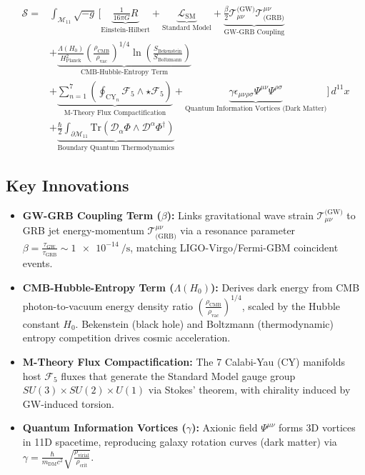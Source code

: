 \documentclass[12pt, a4paper]{article}
\begin{document}
\[
\boxed{
\begin{aligned}
\mathcal{S} = & \int_{\mathcal{M}_{11}} \sqrt{-g} \, \Bigg[ \underbrace{\frac{1}{16\pi G} R}_{\text{Einstein-Hilbert}} + \underbrace{\mathcal{L}_{\text{SM}}}_{\text{Standard Model}} + \underbrace{\frac{\beta}{2} \mathcal{T}_{\mu\nu}^{\text{(GW)}} \mathcal{T}^{\mu\nu}_{\text{(GRB)}}}_{\text{GW-GRB Coupling}} \\
& + \underbrace{\frac{\Lambda(H_0)}{H_{\text{Planck}}^2} \left( \frac{\rho_{\text{CMB}}}{\rho_{\text{vac}}} \right)^{1/4} \ln\left(\frac{S_{\text{Bekenstein}}}{S_{\text{Boltzmann}}}\right)}_{\text{CMB-Hubble-Entropy Term}} \\
& + \underbrace{\sum_{n=1}^7 \left( \oint_{\text{CY}_n} \mathcal{F}_5 \wedge \star \mathcal{F}_5 \right)}_{\text{M-Theory Flux Compactification}} + \underbrace{\gamma \epsilon_{\mu\nu\rho\sigma} \Psi^{\mu\nu} \Psi^{\rho\sigma}}_{\text{Quantum Information Vortices (Dark Matter)}} \Bigg] \, d^{11}x \\
& + \underbrace{\frac{\hbar}{2} \int_{\partial\mathcal{M}_{11}} \text{Tr}\left( \mathcal{D}_\alpha \Phi \wedge \mathcal{D}^\alpha \Phi^\dagger \right)}_{\text{Boundary Quantum Thermodynamics}}
\end{aligned}
}
\]

\subsection{Key Innovations}
\begin{itemize}
\item \textbf{GW-GRB Coupling Term (\(\beta\)):} Links gravitational wave strain \(\mathcal{T}_{\mu\nu}^{\text{(GW)}}\) to GRB jet energy-momentum \(\mathcal{T}^{\mu\nu}_{\text{(GRB)}}\) via a resonance parameter \(\beta = \frac{\tau_{\text{GW}}}{\tau_{\text{GRB}}} \sim \SI{1e-14}{\per\second}\), matching LIGO-Virgo/Fermi-GBM coincident events.

\item \textbf{CMB-Hubble-Entropy Term (\(\Lambda(H_0)\)):} Derives dark energy from CMB photon-to-vacuum energy density ratio \(\left(\frac{\rho_{\text{CMB}}}{\rho_{\text{vac}}}\right)^{1/4}\), scaled by the Hubble constant \(H_0\). Bekenstein (black hole) and Boltzmann (thermodynamic) entropy competition drives cosmic acceleration.

\item \textbf{M-Theory Flux Compactification:} The 7 Calabi-Yau (CY) manifolds host \(\mathcal{F}_5\) fluxes that generate the Standard Model gauge group \(SU(3) \times SU(2) \times U(1)\) via Stokes’ theorem, with chirality induced by GW-induced torsion.

\item \textbf{Quantum Information Vortices (\(\gamma\)):} Axionic field \(\Psi^{\mu\nu}\) forms 3D vortices in 11D spacetime, reproducing galaxy rotation curves (dark matter) via \(\gamma = \frac{\hbar}{m_{\text{DM}} c^2} \sqrt{\frac{\rho_{\text{virial}}}{\rho_{\text{crit}}}}\).
\end{itemize}
\end{document}
